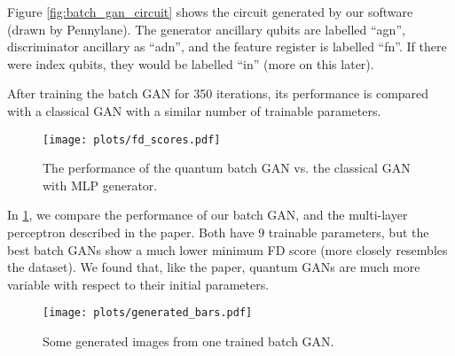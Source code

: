 Figure \ref{fig:batch_gan_circuit} shows the circuit generated by our software 
(drawn by Pennylane).   The generator ancillary qubits are labelled ``agn'', 
discriminator ancillary as ``adn'', and the feature register is labelled ``fn''.
If there were index qubits, they would be labelled ``in'' (more on this later).

After training the batch GAN for 350 iterations, its performance is compared with a classical 
GAN with a similar number of trainable parameters.

\begin{figure}[H]
    \centering
    \texttt{[image: plots/fd\_scores.pdf]}
    \caption{The performance of the quantum batch GAN vs. the classical GAN with MLP generator.}
    \label{fig:fd_scores}
\end{figure}

In \ref{fig:fd_scores}, we compare the performance of our batch GAN, and the multi-layer
perceptron described in the paper.  Both have 9 trainable parameters, but the best batch GANs show 
a much lower minimum FD score (more closely resembles the dataset).  We found that, like the paper,
quantum GANs are much more variable with respect to their initial parameters.

\begin{figure}[H]
    \centering
    \texttt{[image: plots/generated\_bars.pdf]}
    \caption{Some generated images from one trained batch GAN.}
    \label{fig:generated_bars}
\end{figure}
